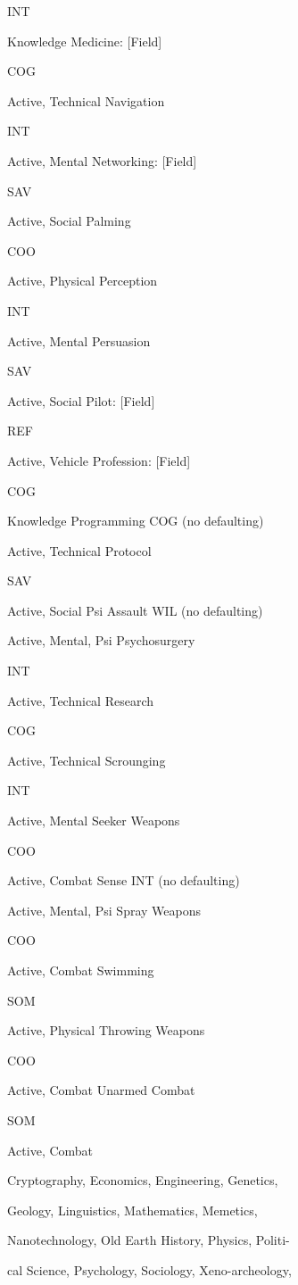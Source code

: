 INT

Knowledge
Medicine: [Field]

COG

Active, Technical
Navigation

INT

Active, Mental
Networking: [Field]

SAV

Active, Social
Palming

COO

Active, Physical
Perception

INT

Active, Mental
Persuasion

SAV

Active, Social
Pilot: [Field]

REF

Active, Vehicle
Profession: [Field]

COG

Knowledge
Programming
COG (no defaulting)

Active, Technical
Protocol

SAV

Active, Social
Psi Assault
WIL (no defaulting)

Active, Mental, Psi
Psychosurgery

INT

Active, Technical
Research

COG

Active, Technical
Scrounging

INT

Active, Mental
Seeker Weapons

COO

Active, Combat
Sense
INT (no defaulting)

Active, Mental, Psi
Spray Weapons

COO

Active, Combat
Swimming

SOM

Active, Physical
Throwing Weapons

COO

Active, Combat
Unarmed Combat

SOM

Active, Combat

Cryptography, Economics, Engineering, Genetics, 

Geology, Linguistics, Mathematics, Memetics, 

Nanotechnology, Old Earth History, Physics, Politi-

cal Science, Psychology, Sociology, Xeno-archeology, 

